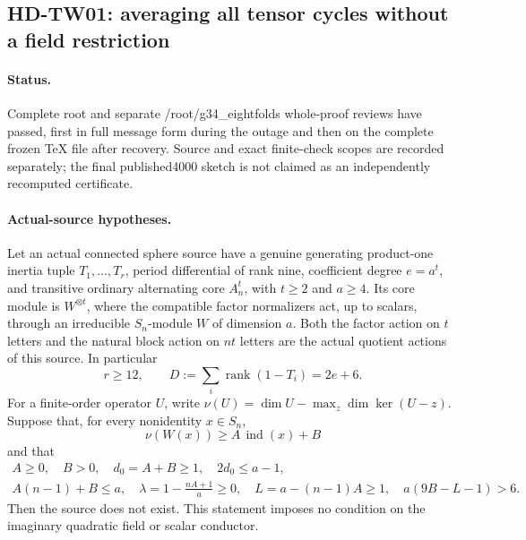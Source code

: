 \subsection{HD-TW01: averaging all tensor cycles without a field restriction}
\paragraph{Status.}
Complete root and separate /root/g34\_eightfolds whole-proof reviews
have passed, first in full message form during the outage and then on the
complete frozen TeX file after recovery. Source and exact finite-check
scopes are recorded separately; the final published4000 sketch is not
claimed as an independently recomputed certificate.
\paragraph{Actual-source hypotheses.}
Let an actual connected sphere source have a genuine generating product-one
inertia tuple \(T_1,\ldots,T_r\), period differential of rank nine, coefficient
degree \(e=a^t\), and transitive ordinary alternating core \(A_n^t\), with
\(t\ge2\) and \(a\ge4\).
Its core module is \(W^{\otimes t}\), where the compatible factor normalizers
act, up to scalars, through an irreducible \(S_n\)-module \(W\) of dimension \(a\).
Both the factor action on \(t\) letters and the natural block action on \(nt\)
letters are the actual quotient actions of this source.  In particular
\[
 r\ge12,\qquad D:=\sum_i\operatorname{rank}(1-T_i)=2e+6.
 \tag{TW.1}
\]
For a finite-order operator \(U\), write
\(\nu(U)=\dim U-\max_z\dim\ker(U-z)\).
Suppose that, for every nonidentity \(x\in S_n\),
\[
 \nu(W(x))\ge A\,\operatorname{ind}(x)+B
 \tag{TW.2}
\]
and that
\[
 \begin{gathered}
 A\ge0,\quad B>0,\quad d_0=A+B\ge1,\quad 2d_0\le a-1,\\
 A(n-1)+B\le a,\quad
 \lambda=1-\frac{nA+1}{a}\ge0,\quad
 L=a-(n-1)A\ge1,\quad a(9B-L-1)>6.
 \end{gathered}\tag{TW.3}
\]
Then the source does not exist.  This statement imposes no condition on the
imaginary quadratic field or scalar conductor.


